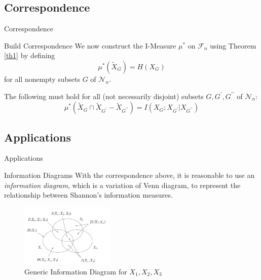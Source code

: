 \subsection{Correspondence}

\begin{frame}{Correspondence}
    \begin{block}{Build Correspondence}
    We now construct the I-Measure $\mu^{*}$ on $\mathcal{F}_{n}$ using Theorem \ref{th1} by defining%
    \begin{equation}
        \mu^{*}\left(\tilde{X}_{G}\right)=H\left(X_{G}\right)
    \end{equation}
    for all nonempty subsets $G$ of $\mathcal{N}_{n} .$ 
    
    The following must hold for all (not necessarily disjoint) subsets $G, G^{\prime}, G^{\prime \prime}$ of $\mathcal{N}_{n}$:
    \begin{equation}\label{eqx1}
        \mu^{*}\left(\tilde{X}_{G} \cap \tilde{X}_{G^{\prime}}-\tilde{X}_{G^{\prime \prime}}\right)=I\left(X_{G} ; X_{G^{\prime}} | X_{G^{\prime \prime}}\right)
    \end{equation}
    \end{block}
\end{frame}


\subsection{Applications}
\begin{frame}{Applications}
    \begin{block}{Information Diagrams}
        With the correspondence above, it is reasonable to use an \emph{information diagram}, which is a variation of Venn diagram, to represent the relationship between Shannon's information measures.
    \end{block}
    \begin{figure}
        \centering
        \includegraphics[height = 3cm]{img/Im3.png}
        \caption{Generic Information Diagram for $X_1, X_2, X_3$}
        \label{fig:genericID}
    \end{figure}
\end{frame}

